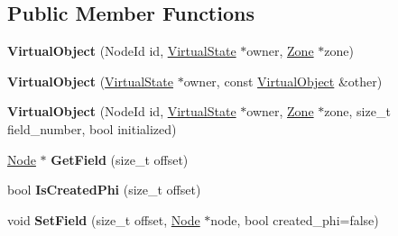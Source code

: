 \subsection*{Public Member Functions}
\begin{DoxyCompactItemize}
\item 
{\bfseries Virtual\+Object} (Node\+Id id, \hyperlink{classv8_1_1internal_1_1compiler_1_1_virtual_state}{Virtual\+State} $\ast$owner, \hyperlink{classv8_1_1internal_1_1_zone}{Zone} $\ast$zone)\hypertarget{classv8_1_1internal_1_1compiler_1_1_virtual_object_aea25b1960c36f511547b3698bc0ec468}{}\label{classv8_1_1internal_1_1compiler_1_1_virtual_object_aea25b1960c36f511547b3698bc0ec468}

\item 
{\bfseries Virtual\+Object} (\hyperlink{classv8_1_1internal_1_1compiler_1_1_virtual_state}{Virtual\+State} $\ast$owner, const \hyperlink{classv8_1_1internal_1_1compiler_1_1_virtual_object}{Virtual\+Object} \&other)\hypertarget{classv8_1_1internal_1_1compiler_1_1_virtual_object_a29318c5720ed11112aa27b15d1e6e5ab}{}\label{classv8_1_1internal_1_1compiler_1_1_virtual_object_a29318c5720ed11112aa27b15d1e6e5ab}

\item 
{\bfseries Virtual\+Object} (Node\+Id id, \hyperlink{classv8_1_1internal_1_1compiler_1_1_virtual_state}{Virtual\+State} $\ast$owner, \hyperlink{classv8_1_1internal_1_1_zone}{Zone} $\ast$zone, size\+\_\+t field\+\_\+number, bool initialized)\hypertarget{classv8_1_1internal_1_1compiler_1_1_virtual_object_a4df19654a6ae2ed7704d5da2d0138cba}{}\label{classv8_1_1internal_1_1compiler_1_1_virtual_object_a4df19654a6ae2ed7704d5da2d0138cba}

\item 
\hyperlink{classv8_1_1internal_1_1compiler_1_1_node}{Node} $\ast$ {\bfseries Get\+Field} (size\+\_\+t offset)\hypertarget{classv8_1_1internal_1_1compiler_1_1_virtual_object_a07afccab06eb36829cfd9c2dc294599e}{}\label{classv8_1_1internal_1_1compiler_1_1_virtual_object_a07afccab06eb36829cfd9c2dc294599e}

\item 
bool {\bfseries Is\+Created\+Phi} (size\+\_\+t offset)\hypertarget{classv8_1_1internal_1_1compiler_1_1_virtual_object_a1ec279bd761135ac2e90db26a5dd2486}{}\label{classv8_1_1internal_1_1compiler_1_1_virtual_object_a1ec279bd761135ac2e90db26a5dd2486}

\item 
void {\bfseries Set\+Field} (size\+\_\+t offset, \hyperlink{classv8_1_1internal_1_1compiler_1_1_node}{Node} $\ast$node, bool created\+\_\+phi=false)\hypertarget{classv8_1_1internal_1_1compiler_1_1_virtual_object_a72086ccf0a427655dc3ce1ec32d245ab}{}\label{classv8_1_1internal_1_1compiler_1_1_virtual_object_a72086ccf0a427655dc3ce1ec32d245ab}


\end{DoxyCompactItemize}
